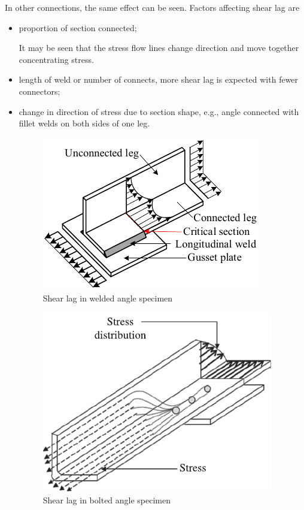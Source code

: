 In other connections, the same effect can be seen. Factors affecting shear lag are
\begin{itemize}
\item proportion of section connected;

It may be seen that the stress flow lines change direction and move together  concentrating stress.
\begin{figure}[H]
\centering

\end{figure}
\item length of weld or number of connects, more shear lag is expected with fewer connectors;
\begin{figure}[H]
\centering

\end{figure}
\item change in direction of stress due to section shape,  e.g., angle connected with fillet welds on both sides of one leg.
\begin{figure}[H]
\centering\footnotesize
\includegraphics{PIC/CH03/SHEARLAG}
\caption{Shear lag in welded angle specimen \citep{Dhanuskar2021}}
\end{figure}
\begin{figure}[H]
\centering\footnotesize
\includegraphics{PIC/CH03/BSL}
\caption{Shear lag in bolted angle specimen}
\end{figure}
\end{itemize}

